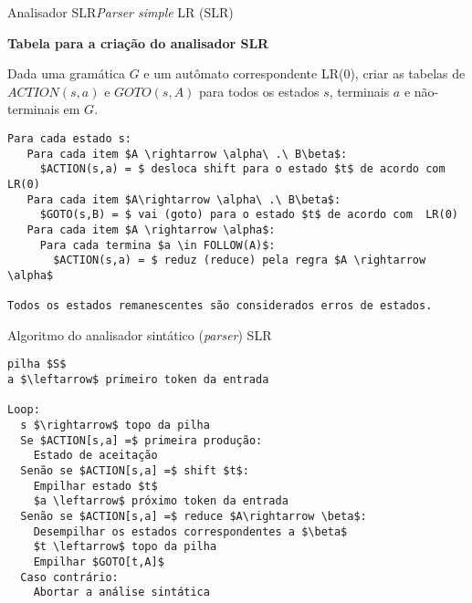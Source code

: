 \begin{frame}[fragile]{Analisador SLR}{{\it Parser simple} LR (SLR)}

{\bf Tabela para a criação do analisador SLR}\bigskip

	Dada uma gramática $G$ e um autômato correspondente LR(0),
	criar as tabelas de $ACTION(s,a)$ e $GOTO(s,A)$ para todos
	os estados $s$, terminais $a$ e não-terminais em $G$.\bigskip

\begin{lstlisting}
Para cada estado s:
   Para cada item $A \rightarrow \alpha\ .\ B\beta$:
     $ACTION(s,a) = $ desloca shift para o estado $t$ de acordo com  LR(0)
   Para cada item $A\rightarrow \alpha\ .\ B\beta$:
     $GOTO(s,B) = $ vai (goto) para o estado $t$ de acordo com  LR(0)
   Para cada item $A \rightarrow \alpha$:
     Para cada termina $a \in FOLLOW(A)$:
       $ACTION(s,a) = $ reduz (reduce) pela regra $A \rightarrow \alpha$

Todos os estados remanescentes são considerados erros de estados.
\end{lstlisting}

\end{frame}

\begin{frame}[fragile]{Algoritmo do analisador sintático ({\it parser\/}) SLR}

\begin{lstlisting}
pilha $S$
a $\leftarrow$ primeiro token da entrada

Loop:
  s $\rightarrow$ topo da pilha
  Se $ACTION[s,a] =$ primeira produção:
    Estado de aceitação
  Senão se $ACTION[s,a] =$ shift $t$:
    Empilhar estado $t$
    $a \leftarrow$ próximo token da entrada
  Senão se $ACTION[s,a] =$ reduce $A\rightarrow \beta$:
    Desempilhar os estados correspondentes a $\beta$
    $t \leftarrow$ topo da pilha
    Empilhar $GOTO[t,A]$
  Caso contrário:
    Abortar a análise sintática
\end{lstlisting}

\end{frame}

